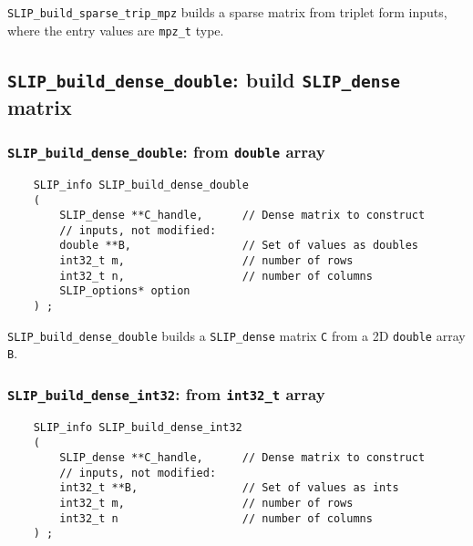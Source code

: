 \documentclass[12pt]{article}
\theoremstyle{definition}
\begin{document}
\verb|SLIP_build_sparse_trip_mpz| builds a sparse matrix from triplet form
inputs, where the entry values are \verb|mpz_t| type.

\cprotect\subsection{\verb|SLIP_build_dense_double|: build \verb'SLIP_dense' matrix}

\cprotect\subsubsection{\verb|SLIP_build_dense_double|: from \verb|double| array}
\label{s:user:build_dense_double}

\begin{mdframed}[userdefinedwidth=6in]
{\footnotesize
\begin{verbatim}
    SLIP_info SLIP_build_dense_double
    (
        SLIP_dense **C_handle,      // Dense matrix to construct
        // inputs, not modified:
        double **B,                 // Set of values as doubles
        int32_t m,                  // number of rows
        int32_t n,                  // number of columns
        SLIP_options* option
    ) ;
\end{verbatim}
} \end{mdframed}

\verb|SLIP_build_dense_double| builds a \verb'SLIP_dense' matrix \verb'C'
from a 2D \verb|double| array \verb'B'.

\cprotect\subsubsection{\verb|SLIP_build_dense_int32|: from \verb|int32_t| array}
\label{s:user:build_dense_int32}

\begin{mdframed}[userdefinedwidth=6in]
{\footnotesize
\begin{verbatim}
    SLIP_info SLIP_build_dense_int32
    (
        SLIP_dense **C_handle,      // Dense matrix to construct
        // inputs, not modified:
        int32_t **B,                // Set of values as ints
        int32_t m,                  // number of rows
        int32_t n                   // number of columns
    ) ;
\end{verbatim}
} \end{mdframed}
\end{document}
